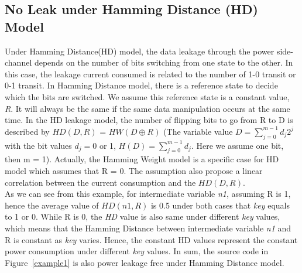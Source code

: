 \documentclass[10pt, conference]{IEEEtran}
\begin{document}
\subsection{No Leak under Hamming Distance (HD) Model}
Under Hamming Distance(HD) model, the data leakage through the power side-channel depends on the number of bits switching from one state to the other. In this case, the leakage current consumed is related to the number of 1-0 transit or 0-1 transit. In Hamming Distance model, there is a reference state to decide which the bits are switched. We assume this reference state is a constant value, \emph{R}. It will always be the same if the same data manipulation occurs at the same time. In the HD leakage model, the number of flipping bits to go from R to D is described by $HD(D, R)$ = $HW(D \oplus R)$ (The variable value $D = \sum _{ j=0 }^{ m-1 }{ { d }_{ j }{ 2 }^{ j } }$ with the bit values $ { d }_{ j } = 0$ or 1, $H(D) = \sum _{ j=0 }^{ m-1 }{ { d }_{ j } }$. Here we assume one bit, then m = 1). Actually, the Hamming Weight model is a specific case for HD model which assumes that R = 0. The assumption also propose a linear correlation between the current consumption and the $HD(D, R)$.
\\
As we can see from this example, for intermediate variable \emph{n1}, assuming R is 1, hence the average value of $HD(n1, R)$ is 0.5 under both cases that  \emph{key} equals to 1 or 0. While R is 0, the \emph{HD} value is also same under different \emph{key} values, which means that the Hamming Distance between intermediate variable \emph{n1} and R is constant as \emph{key} varies. Hence, the constant HD values represent the constant power consumption under different  \emph{key} values. In sum, the source code in Figure~\ref{example1} is also power leakage free under Hamming Distance model.
\end{document}
